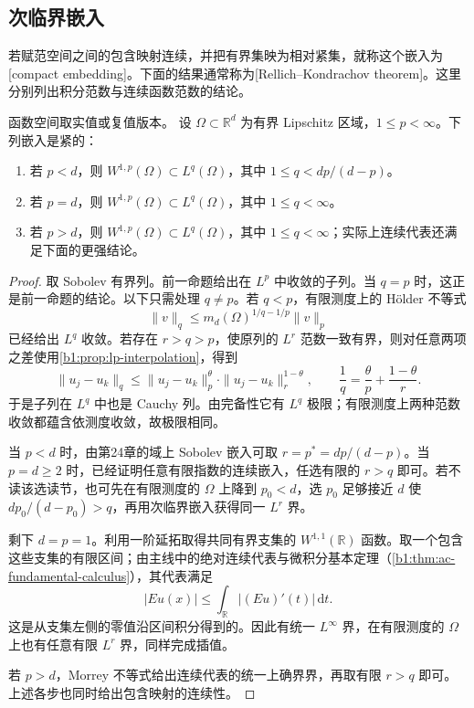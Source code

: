 \subsection{次临界嵌入}
\label{b1:subsec:250202}

若赋范空间之间的包含映射连续，并把有界集映为相对紧集，就称这个嵌入为[compact embedding]。下面的结果通常称为[Rellich--Kondrachov theorem]。这里分别列出积分范数与连续函数范数的结论。

\begin{theorem}\label{b1:thm:rellich-subcritical}
函数空间取实值或复值版本。
设 \(\Omega\subset\mathbb R^d\) 为有界 Lipschitz 区域，\(1\le p<\infty\)。下列嵌入是紧的：
\begin{enumerate}
\item 若 \(p<d\)，则 \(W^{1,p}(\Omega)\subset L^q(\Omega)\)，其中 \(1\le q<dp/(d-p)\)。
\item 若 \(p=d\)，则 \(W^{1,p}(\Omega)\subset L^q(\Omega)\)，其中 \(1\le q<\infty\)。
\item 若 \(p>d\)，则 \(W^{1,p}(\Omega)\subset L^q(\Omega)\)，其中 \(1\le q<\infty\)；实际上连续代表还满足下面的更强结论。
\end{enumerate}
\end{theorem}
\begin{proof}
取 Sobolev 有界列。前一命题给出在 \(L^p\) 中收敛的子列。当 \(q=p\) 时，这正是前一命题的结论。以下只需处理 \(q\ne p\)。若 \(q<p\)，有限测度上的 Hölder 不等式
\[
 \|v\|_q\le m_d(\Omega)^{1/q-1/p}\|v\|_p
\]
已经给出 \(L^q\) 收敛。若存在 \(r>q>p\)，使原列的 \(L^r\) 范数一致有界，则对任意两项之差使用\cref{b1:prop:lp-interpolation}，得到
\[
 \|u_j-u_k\|_q
 \le \|u_j-u_k\|_p^\theta
       \cdot\|u_j-u_k\|_r^{1-\theta},
 \qquad
 \frac1q=\frac\theta p+\frac{1-\theta}r.
\]
于是子列在 \(L^q\) 中也是 Cauchy 列。由完备性它有 \(L^q\) 极限；有限测度上两种范数收敛都蕴含依测度收敛，故极限相同。

当 \(p<d\) 时，由第24章的域上 Sobolev 嵌入可取 \(r=p^*=dp/(d-p)\)。当 \(p=d\ge2\) 时，已经证明任意有限指数的连续嵌入，任选有限的 \(r>q\) 即可。若不读该选读节，也可先在有限测度的 \(\Omega\) 上降到 \(p_0<d\)，选 \(p_0\) 足够接近 \(d\) 使 \(dp_0/(d-p_0)>q\)，再用次临界嵌入获得同一 \(L^r\) 界。

剩下 \(d=p=1\)。利用一阶延拓取得共同有界支集的 \(W^{1,1}(\mathbb R)\) 函数。取一个包含这些支集的有限区间；由主线中的绝对连续代表与微积分基本定理（\cref{b1:thm:ac-fundamental-calculus}），其代表满足
\[
 |Eu(x)|\le\int_{\mathbb R}|(Eu)'(t)|\,\mathrm dt.
\]
这是从支集左侧的零值沿区间积分得到的。因此有统一 \(L^\infty\) 界，在有限测度的 \(\Omega\) 上也有任意有限 \(L^r\) 界，同样完成插值。

若 \(p>d\)，Morrey 不等式给出连续代表的统一上确界界，再取有限 \(r>q\) 即可。上述各步也同时给出包含映射的连续性。
\end{proof}

